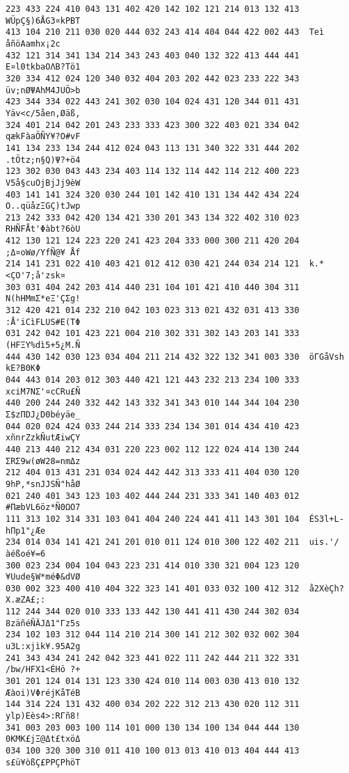 \documentclass{article}
\begin{document}
\begin{Verbatim}[fontsize=\small]
223 433 224 410 043 131 402 420 142 102 121 214 013 132 413  WÜpÇ§)6ÅG3¤kPBT
413 104 210 211 030 020 444 032 243 414 404 044 422 002 443  Teì åñöAamhx¡2c
432 121 314 341 134 214 343 243 403 040 132 322 413 444 441  E¤l0tkbaOΛB?Tö1
320 334 412 024 120 340 032 404 203 202 442 023 233 222 343  üv;nØΨAhM4JUÖ>b
423 344 334 022 443 241 302 030 104 024 431 120 344 011 431  Yäv<c/5åen,Øäß,
324 401 214 042 201 243 233 333 423 300 322 403 021 334 042  qækFàaÖÑY¥?O#vF
141 134 233 134 244 412 024 043 113 131 340 322 331 444 202  .tÖtz;n§Q)Ψ?+ö4
123 302 030 043 443 234 403 114 132 114 442 114 212 400 223  V5å§cuOjBjJj9èW
403 141 141 324 320 030 244 101 142 410 131 134 442 434 224  O..qüåzΞGÇ)tJwp
213 242 333 042 420 134 421 330 201 343 134 322 402 310 023  RHÑFÅt'Φàbt?6òU
412 130 121 124 223 220 241 423 204 333 000 300 211 420 204  ;Δ¤oWø/YfÑ@¥ Åf
214 141 231 022 410 403 421 012 412 030 421 244 034 214 121  k.*<ÇO'7;å'zsk¤
303 031 404 242 203 414 440 231 104 101 421 410 440 304 311  N(hHMmΣ*eΞ'ÇΣg!
312 420 421 014 232 210 042 103 023 313 021 432 031 413 330  :Å'iCìFLUS#E(TΦ
031 242 042 101 423 221 004 210 302 331 302 143 203 141 333  (HFΞY%dì5+5¿M.Ñ
444 430 142 030 123 034 404 211 214 432 322 132 341 003 330  öΓGåVsh kE?B0KΦ
044 443 014 203 012 303 440 421 121 443 232 213 234 100 333  xciM7NΣ'¤cCRu£Ñ
440 200 244 240 332 442 143 332 341 343 010 144 344 104 230  Σ$zΠDJ¿D0béyäe_
044 020 024 424 033 244 214 333 234 134 301 014 434 410 423  xñnrZzkÑutÆiwÇY
440 213 440 212 434 031 220 223 002 112 122 024 414 130 244  ΣRΣ9w(øW28=nmΔz
212 404 013 431 231 034 024 442 442 313 333 411 404 030 120  9hP,*snJJSÑ"håØ
021 240 401 343 123 103 402 444 244 231 333 341 140 403 012  #ΠæbVL6öz*Ñ0ΩO7
111 313 102 314 331 103 041 404 240 224 441 411 143 301 104  ÉS3l+L-hΠp1"¿Æe
234 014 034 141 421 241 201 010 011 124 010 300 122 402 211  uis.'/àéßoé¥=6
300 023 234 004 104 043 223 231 414 010 330 321 004 123 120  ¥Uude§W*méΦ&dVØ
030 002 323 400 410 404 322 323 141 401 033 032 100 412 312  å2XèÇh?X.æZA£;:
112 244 344 020 010 333 133 442 130 441 411 430 244 302 034  8zäñéÑÄJΔ1"Γz5s
234 102 103 312 044 114 210 214 300 141 212 302 032 002 304  u3L:xjìk¥.95A2g
241 343 434 241 242 042 323 441 022 111 242 444 211 322 331  /bw/HFX1<ÉHö ?+
301 201 124 014 131 123 330 424 010 114 003 030 413 010 132  Æàoi)VΦréjKåTéB
144 314 224 131 432 400 034 202 222 312 213 430 020 112 311  ylp)Eès4>:RΓñ8!
341 003 203 003 100 114 101 000 130 134 100 134 044 444 130  0KMK£jΞ@Δt£txöΔ
034 100 320 300 310 011 410 100 013 013 410 013 404 444 413  s£ü¥òßÇ£PPÇPhöT

\end{Verbatim}
\end{document}
